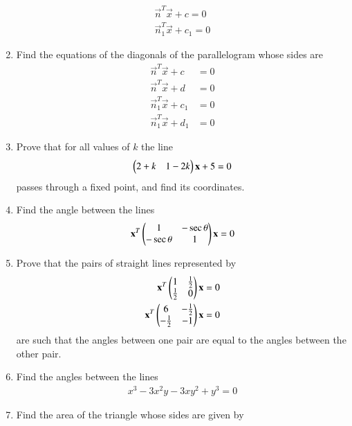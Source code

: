 \begin{enumerate}[label=\arabic*.,ref=\thesubsection.\theenumi]
\begin{align}
\vec{n}^T\vec{x}+c=0
\\
\vec{n}_1^T\vec{x}+c_1=0
\end{align}
\item Find  the equations of the diagonals of the parallelogram whose sides are
\begin{align}
\vec{n}^T\vec{x}+c&=0
\\
\vec{n}^T\vec{x}+d&=0
\\
\vec{n}_1^T\vec{x}+c_1&=0
\\
\vec{n}_1^T\vec{x}+d_1&=0
\end{align}
\renewcommand{\theequation}{\theenumi}
\item Prove that for all values of $k$ the line
\begin{align}
\begin{pmatrix}2+k &1-2k\end{pmatrix}\mathbf{x} + 5 = 0
\end{align}
passes through a fixed point, and find its coordinates.
\item Find the angle between the lines
\begin{align}
\mathbf{x}^T
\begin{pmatrix}1 & -\sec \theta\\-\sec\theta & 1\end{pmatrix} 
\mathbf{x} = 0
\end{align}
\item Prove that the pairs of straight lines represented by
\begin{align}
\mathbf{x}^T
\begin{pmatrix}1 & \frac{1}{2}\\\frac{1}{2} & 0\end{pmatrix} 
\mathbf{x} = 0
\\
\mathbf{x}^T
\begin{pmatrix}6 & -\frac{1}{2}\\-\frac{1}{2} & -1\end{pmatrix} 
\mathbf{x} = 0
\end{align}
are such that the angles between one pair are equal to the angles between the other pair.
\renewcommand{\theequation}{\theenumi}
\item Find the angles between the lines
\begin{align}
x^3-3x^2y-3xy^2+y^3 = 0
\end{align}
\item Find the area of the triangle whose sides are given by
\begin{align}

\end{align}
\end{enumerate}
